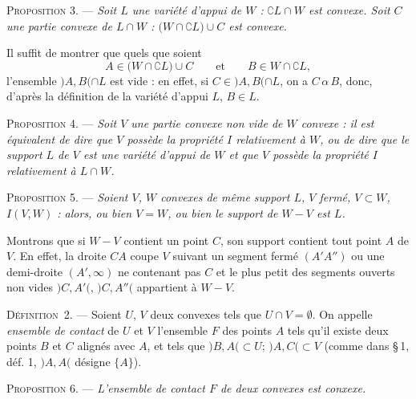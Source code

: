 \documentclass[11pt]{article}
\newcommand{\bzcf}[2]{#1}
\newcommand{\bznum}[1]{\if\relax\detokenize{#1}\relax\else\ #1\fi}
\newenvironment{defin}[1][]{\par\medskip\noindent\textsc{Définition\bznum{#1}.} --- }{\par\medskip}
\newenvironment{prop}[1][]{\par\medskip\noindent\textsc{Proposition #1.} --- \itshape}{\par\medskip}
\newenvironment{proof}[1][]{\par}{\par}
\begin{document}
\begin{prop}[3]
Soit $L$ une variété d'appui de $W$ : $\complement L\cap W$ est convexe. Soit $C$ une partie
convexe de $L\cap W$ : $\bigl(W\cap\complement L\bigr)\cup C$ est convexe.
\end{prop}

\begin{proof}
Il suffit de montrer que quels que soient
\[ A\in\bigl(W\cap\complement L\bigr)\cup C\qquad\text{et}\qquad B\in W\cap\complement L, \]
l'ensemble $)A, B(\cap L$ est vide : en effet, si $C\in)A, B(\cap L$, on a $C\,\alpha\,B$,
donc, d'après \bzcf{la définition de la variété d'appui}{\ref{bzdef:c3s1d3_variete_appui}} $L$,
$B\in L$.
\end{proof}

\begin{prop}[4]
Soit $V$ une partie convexe non vide de $W$ convexe : il est équivalent de dire que $V$ possède
la propriété $I$ relativement à $W$, ou de dire que le support $L$ de $V$ est une variété d'appui
de $W$ et que $V$ possède la propriété $I$ relativement à $L\cap W$.
\end{prop}

\begin{prop}[5]
Soient $V$, $W$ convexes de même support $L$, $V$ fermé, $V\subset W$, $I(V, W)$ : alors, ou bien
$V=W$, ou bien le support de $W-V$ est $L$.
\end{prop}

\begin{proof}
Montrons que si $W-V$ contient un point $C$, son support contient tout
point $A$ de $V$. En effet, la droite $CA$ coupe $V$ suivant un segment fermé $(A'A'')$ ou une
demi-droite $(A', \infty)$ ne contenant pas $C$ et le plus petit des segments ouverts non vides
$)C, A'($, $)C, A''($ appartient à $W-V$.
\end{proof}

\begin{defin}[2]
Soient $U$, $V$ deux convexes tels que $U\cap V=\emptyset$. On appelle \textit{ensemble de
contact} de $U$ et $V$ l'ensemble $F$ des points $A$ tels qu'il existe deux points $B$ et $C$
alignés avec $A$, et tels que $)B, A(\subset U$; $)A, C(\subset V$ (comme dans \bzcf{\S\,1,
déf. 1}{\ref{bzdef:c3s1d1_preordre_alpha}}, $)A, A($ désigne $\{A\}$).
\end{defin}

\begin{prop}[6]
L'ensemble de contact $F$ de deux convexes est conxexe.
\end{prop}
\end{document}
